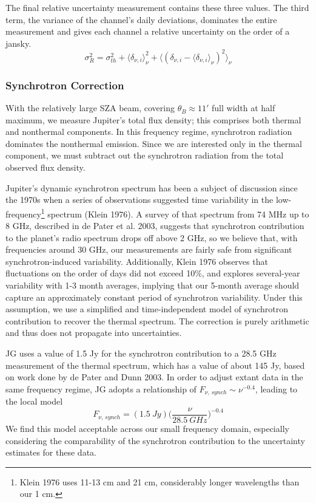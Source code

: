 \documentclass{article}
\begin{document}
	The final relative uncertainty measurement contains these three values.
	The third term, the variance of the channel's daily deviations, dominates the entire measurement and gives each channel a relative uncertainty on the order of a jansky.
	$$ \sigma_{R}^{2} = \sigma_{th}^{2} + \langle \delta_{\nu, i} \rangle_{\nu}^{2}
		 + \Big\langle (\delta_{\nu, i} - \langle \delta_{\nu, i} \rangle_{\nu})^{2} \Big\rangle_{\nu} $$


\subsubsection{Synchrotron Correction}

	With the relatively large SZA beam, covering $\theta_{B} \approx 11'$ full width at half maximum, we measure Jupiter's total flux density; this comprises both thermal and nonthermal components.
	In this frequency regime, synchrotron radiation dominates the nonthermal emission.
	Since we are interested only in the thermal component, we must subtract out the synchrotron radiation from the total observed flux density.

	Jupiter's dynamic synchrotron spectrum has been a subject of discussion since the 1970s when a series of observations suggested time variability in the low-frequency\footnote{Klein 1976 uses 11-13 cm and 21 cm, considerably longer wavelengths than our 1 cm.} spectrum (Klein 1976).
	A survey of that spectrum from 74 MHz up to 8 GHz, described in de Pater et al. 2003, suggests that synchrotron contribution to the planet's radio spectrum drops off above 2 GHz, so we believe that, with frequencies around 30 GHz, our measurements are fairly safe from significant synchrotron-induced variability.
	Additionally, Klein 1976 observes that fluctuations on the order of days did not exceed 10\%, and explores several-year variability with 1-3 month averages, implying that our 5-month average should capture an approximately constant period of synchrotron variability.
	Under this assumption, we use a simplified and time-independent model of synchrotron contribution to recover the thermal spectrum.
	The correction is purely arithmetic and thus does not propagate into uncertainties.

	JG uses a value of 1.5 Jy for the synchrotron contribution to a 28.5 GHz measurement of the thermal spectrum, which has a value of about 145 Jy, based on work done by de Pater and Dunn 2003.
	In order to adjust extant data in the same frequency regime, JG adopts a relationship of $F_{\nu,\,synch} \sim \nu^{-0.4}$, leading to the local model
	$$F_{\nu,\,synch} =  (1.5 \ Jy)\Bigg(\frac{\nu}{28.5 \ GHz}\Bigg)^{-0.4}$$
	We find this model acceptable across our small frequency domain, especially considering the comparability of the synchrotron contribution to the uncertainty estimates for these data.
\end{document}
